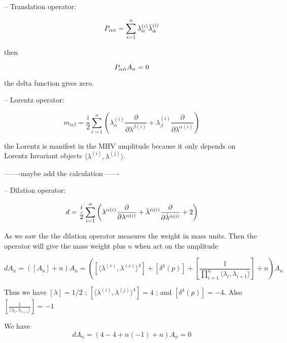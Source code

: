 -- Translation operator:

\begin{equation}
P_{\alpha \dot{\alpha}} = \sum_{i=1}^{n} \lambda^{(i)}_{\alpha}\bar{\lambda}^{(i)}_{\dot{\alpha}}
\end{equation}


then 

\begin{equation}
P_{\alpha \dot{\alpha}} A_{n} = 0 
\end{equation}

the delta function gives zero. 

-- Lorentz operator:

\begin{equation}
 m_{\alpha \beta} = \frac{i}{2} \sum_{i=1}^{n} \left(  \lambda_{\alpha}^{(i)} \frac{\partial}{\partial \lambda^{\beta(i)}}  + \lambda_{\beta}^{(i)} \frac{\partial}{\partial \lambda^{\alpha(i)}}  \right)
\end{equation}


the Lorentz is manifest in the MHV amplitude because it only depends on Lorentz Invariant objects $\langle \lambda^{(i)},\lambda^{(j)}  \rangle$.

-------maybe add the calculation-------




-- Dilation operator:

\begin{equation}
d = \frac{i}{2} \sum_{i=1}^{n} \left( \lambda^{\alpha(i)} \frac{\partial}{\partial \lambda^{\alpha(i)}}  + \bar{\lambda}^{\dot{\alpha}(i)} \frac{\partial}{\partial \bar{\lambda}^{\dot{\alpha}(i)}} + 2\right) 
\end{equation}

As we saw the the dilation operator measures the weight in mass units. Then the operator will give the mass weight plus $n$ when act on the amplitude

\begin{equation}
d A_{n} = ([A_{n}] + n)A_{n} = \left(  [\langle \lambda^{(r)},\lambda^{(s)}  \rangle^{4}] + [\delta^{4}(p)] + [\frac{1}{\prod_{i=1}^{n}\langle \lambda_{i},\lambda_{i+1}\rangle}] + n \right)A_{n}
\end{equation}

Thus we have $[\lambda] = 1/2$ ; $[\langle \lambda^{(i)},\lambda^{(j)}  \rangle^{4}] = 4$ ; and $[\delta^{4}(p)] = -4$. Also$[ \frac{1}{\langle \lambda_{i},\lambda_{i+1}\rangle}] = -1$ 

We have 
\begin{equation}
d A_{n} = (4 - 4  + n(-1) + n)A_{n} = 0
\end{equation}



